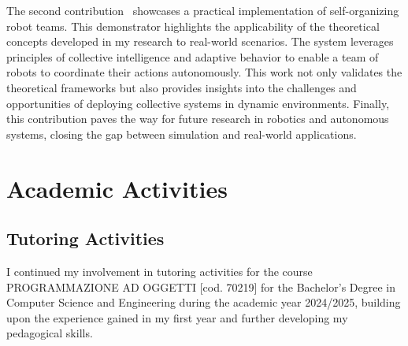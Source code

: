 \documentclass[runningheads]{llncs}
\begin{document}
The second contribution~\cite{DBLP:conf/coordination/AguzziBBCCDFPV25} showcases a practical implementation of self-organizing robot teams.
%
This demonstrator highlights the applicability of the theoretical concepts developed in my research to real-world scenarios.
%
The system leverages principles of collective intelligence and adaptive behavior to enable a team of robots to coordinate their actions autonomously.
%
This work not only validates the theoretical frameworks but also provides insights into the challenges and opportunities of deploying collective systems in dynamic environments.
%
Finally,
this contribution paves the way for future research in robotics and autonomous systems,
closing the gap between simulation and real-world applications.




\section{Academic Activities}

\subsection{Tutoring Activities}

I continued my involvement in tutoring activities for the course PROGRAMMAZIONE AD OGGETTI [cod. 70219] for the Bachelor's Degree in Computer Science and Engineering during the academic year 2024/2025, building upon the experience gained in my first year and further developing my pedagogical skills.
\end{document}
